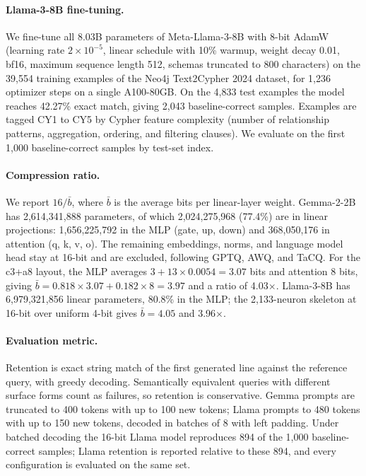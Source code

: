 \documentclass[11pt]{article}
\begin{document}
\paragraph{Llama-3-8B fine-tuning.}
We fine-tune all 8.03B parameters of Meta-Llama-3-8B with 8-bit 
AdamW (learning rate $2{\times}10^{-5}$, linear schedule with 
10\% warmup, weight decay 0.01, bf16, maximum sequence length 
512, schemas truncated to 800 characters) on the 39,554 
training examples of the Neo4j Text2Cypher 2024 dataset, for 
1,236 optimizer steps on a single A100-80GB. On the 4,833 test 
examples the model reaches 42.27\% exact match, giving 2,043 
baseline-correct samples. Examples are tagged CY1 to CY5 by 
Cypher feature complexity (number of relationship patterns, 
aggregation, ordering, and filtering clauses). We evaluate on 
the first 1,000 baseline-correct samples by test-set index.

\paragraph{Compression ratio.}
We report $16/\bar{b}$, where $\bar{b}$ is the average bits per 
linear-layer weight. Gemma-2-2B has 2,614,341,888 parameters, 
of which 2,024,275,968 (77.4\%) are in linear projections: 
1,656,225,792 in the MLP (gate, up, down) and 368,050,176 in 
attention (q, k, v, o). The remaining embeddings, norms, and 
language model head stay at 16-bit and are excluded, following 
GPTQ, AWQ, and TaCQ. For the c3+a8 layout, the MLP averages 
$3 + 13 \times 0.0054 = 3.07$ bits and attention 8 bits, giving 
$\bar{b} = 0.818 \times 3.07 + 0.182 \times 8 = 3.97$ and a 
ratio of 4.03$\times$. Llama-3-8B has 6,979,321,856 linear 
parameters, 80.8\% in the MLP; the 2,133-neuron skeleton at 
16-bit over uniform 4-bit gives $\bar{b} = 4.05$ and 
3.96$\times$.

\paragraph{Evaluation metric.}
Retention is exact string match of the first generated line 
against the reference query, with greedy decoding. Semantically 
equivalent queries with different surface forms count as 
failures, so retention is conservative. Gemma prompts are 
truncated to 400 tokens with up to 100 new tokens; Llama prompts 
to 480 tokens with up to 150 new tokens, decoded in batches of 
8 with left padding. Under batched decoding the 16-bit Llama 
model reproduces 894 of the 1,000 baseline-correct samples; 
Llama retention is reported relative to these 894, and every 
configuration is evaluated on the same set.
\end{document}

